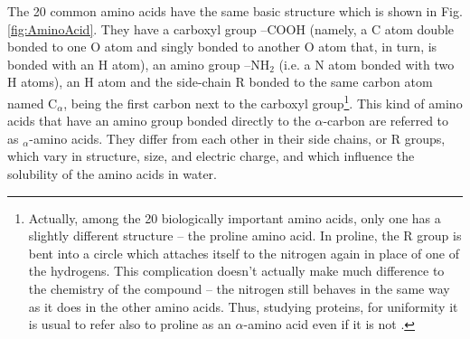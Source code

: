The 20 common amino acids have the same basic structure which is shown in Fig. \ref{fig:AminoAcid}. %
They have a carboxyl group --COOH (namely, a C atom double bonded to one O atom and singly bonded to another O atom that, in turn, is bonded with an H atom), an amino group --NH$_2$ (i.e. a N atom bonded with two H atoms), an H atom and the side-chain R bonded to the same carbon atom named C$_\alpha$, being the first carbon next to the carboxyl group\footnote{Actually, among the 20 biologically important amino acids, only one has a slightly different structure -- the proline amino acid. In proline, the R group is bent into a circle which attaches itself to the nitrogen again in place of one of the hydrogens. This complication doesn't actually make much difference to the chemistry of the compound -- the nitrogen still behaves in the same way as it does in the other amino acids. Thus, studying proteins,  for uniformity it is usual to refer also to proline as an $\alpha$-amino acid even if it is not
\cite{clark2016amino}.}.
This kind of amino acids that have an amino group bonded directly to the $\alpha$-carbon are referred to as $_\alpha$-amino acids. They differ from each other in their side chains,
or R groups, which vary in structure, size, and electric charge, and which influence the solubility of the amino acids in water. 

